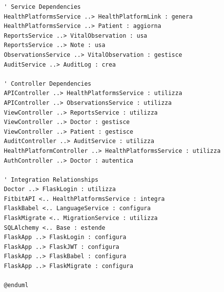 \documentclass[12pt,a4paper,oneside]{report}
\begin{document}
\begin{lstlisting}[basicstyle=\small\ttfamily, breaklines=true]
' Service Dependencies
HealthPlatformsService ..> HealthPlatformLink : genera
HealthPlatformsService ..> Patient : aggiorna
ReportsService ..> VitalObservation : usa
ReportsService ..> Note : usa
ObservationsService ..> VitalObservation : gestisce
AuditService ..> AuditLog : crea

' Controller Dependencies
APIController ..> HealthPlatformsService : utilizza
APIController ..> ObservationsService : utilizza
ViewController ..> ReportsService : utilizza
ViewController ..> Doctor : gestisce
ViewController ..> Patient : gestisce
AuditController ..> AuditService : utilizza
HealthPlatformController ..> HealthPlatformsService : utilizza
AuthController ..> Doctor : autentica

' Integration Relationships
Doctor ..> FlaskLogin : utilizza
FitbitAPI <.. HealthPlatformsService : integra
FlaskBabel <.. LanguageService : configura
FlaskMigrate <.. MigrationService : utilizza
SQLAlchemy <.. Base : estende
FlaskApp ..> FlaskLogin : configura
FlaskApp ..> FlaskJWT : configura
FlaskApp ..> FlaskBabel : configura
FlaskApp ..> FlaskMigrate : configura

@enduml
\end{lstlisting}
\end{document}
